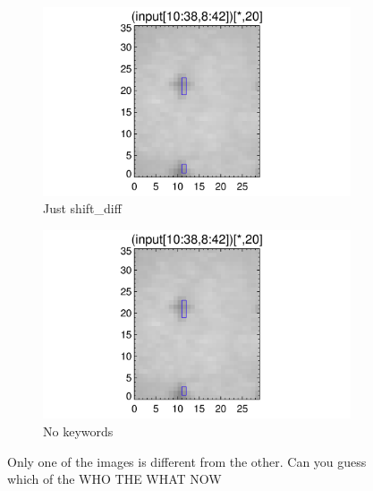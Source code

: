 \documentclass[10pt]{article}
\begin{document}
\begin{figure}[!h]
   \begin{subfigure}[b]{.45\linewidth}
        \centering
        \includegraphics[width=1.3\textwidth]{../plots_tables_images/fidcheck_withshiftdifftruncate0.png}
        \caption{Just shift\_diff}
    \end{subfigure}
    \begin{subfigure}[b]{.45\linewidth}
        \centering
        \includegraphics[width=1.3\textwidth]{../plots_tables_images/fidcheck_withnotruncate0.png}
        \caption{No keywords}
    \end{subfigure}
    \caption{Only one of the images is different from the other. Can you guess which of the WHO THE WHAT NOW}
    \label{whyedgetrunc}
\end{figure}
\end{document}
